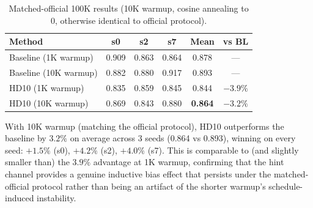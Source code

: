 \documentclass[11pt]{article}
\begin{document}
\begin{table}[h]
\centering
\caption{Matched-official 100K results (10K warmup, cosine annealing to 0, otherwise identical to official protocol).}
\label{tab:matched_official}
\small
\begin{tabular}{lccccc}
\toprule
\textbf{Method} & \textbf{s0} & \textbf{s2} & \textbf{s7} & \textbf{Mean} & \textbf{vs BL} \\
\midrule
Baseline (1K warmup) & 0.909 & 0.863 & 0.864 & 0.878 & --- \\
Baseline (10K warmup) & 0.882 & 0.880 & 0.917 & 0.893 & --- \\
\midrule
HD10 (1K warmup) & 0.835 & 0.859 & 0.845 & 0.844 & $-3.9\%$ \\
HD10 (10K warmup) & 0.869 & 0.843 & 0.880 & \textbf{0.864} & $\mathbf{-3.2\%}$ \\
\bottomrule
\end{tabular}
\end{table}

With 10K warmup (matching the official protocol), HD10 outperforms the baseline by $3.2\%$ on average across 3 seeds (0.864 vs 0.893), winning on every seed: $+1.5\%$ (s0), $+4.2\%$ (s2), $+4.0\%$ (s7). This is comparable to (and slightly smaller than) the $3.9\%$ advantage at 1K warmup, confirming that the hint channel provides a genuine inductive bias effect that persists under the matched-official protocol rather than being an artifact of the shorter warmup's schedule-induced instability.
\end{document}
